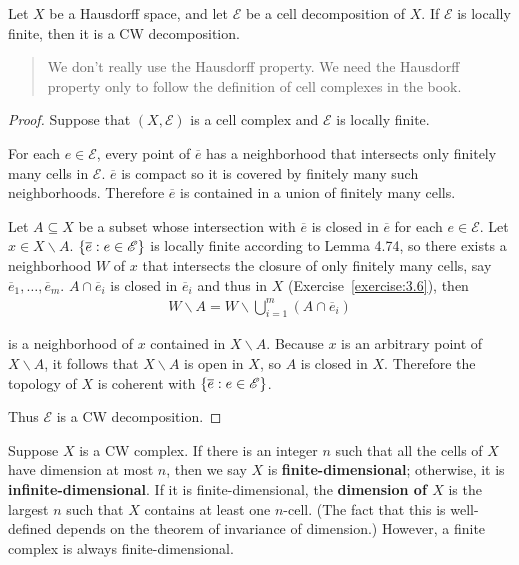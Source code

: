 \begin{prop}{5.4}
	Let $X$ be a Hausdorff space, and let $\mathscr{E}$ be a cell decomposition of $X$. If $\mathscr{E}$ is locally finite, then it is a CW decomposition.
\end{prop}

\begin{quotation}
	We don't really use the Hausdorff property. We need the Hausdorff property only to follow the definition of cell complexes in the book.
\end{quotation}

\begin{proof}
	Suppose that $(X, \mathscr{E})$ is a cell complex and $\mathscr{E}$ is locally finite.

	For each $e\in \mathscr{E}$, every point of $\overline{e}$ has a neighborhood that intersects only finitely many cells in $\mathscr{E}$. $\overline{e}$ is compact so it is covered by finitely many such neighborhoods. Therefore $\overline{e}$ is contained in a union of finitely many cells.

	Let $A \subseteq X$ be a subset whose intersection with $\overline{e}$ is closed in $\overline{e}$ for each $e\in \mathscr{E}$. Let $x \in X\smallsetminus A$. $\left\{{ \overline{e} : e\in\mathscr{E} }\right\}$ is locally finite according to Lemma 4.74, so there exists a neighborhood $W$ of $x$ that intersects the closure of only finitely many cells, say $\overline{e}_{1}, \ldots, \overline{e}_{m}$. $A \cap \overline{e}_{i}$ is closed in $\overline{e}_{i}$ and thus in $X$ (Exercise~\ref{exercise:3.6}), then
	\begin{align*}
		W\smallsetminus A = W \smallsetminus \bigcup^{m}_{i=1}(A\cap \overline{e}_{i})
	\end{align*}

	is a neighborhood of $x$ contained in $X\smallsetminus A$. Because $x$ is an arbitrary point of $X\smallsetminus A$, it follows that $X\smallsetminus A$ is open in $X$, so $A$ is closed in $X$. Therefore the topology of $X$ is coherent with $\left\{{ \overline{e} : e \in \mathscr{E} }\right\}$.

	Thus $\mathscr{E}$ is a CW decomposition.
\end{proof}

Suppose $X$ is a CW complex. If there is an integer $n$ such that all the cells of $X$ have dimension at most $n$, then we say $X$ is \textbf{finite-dimensional}; otherwise, it is \textbf{infinite-dimensional}. If it is finite-dimensional, the \textbf{dimension of $X$} is the largest $n$ such that $X$ contains at least one $n$-cell. (The fact that this is well-defined depends on the theorem of invariance of dimension.) However, a finite complex is always finite-dimensional.

